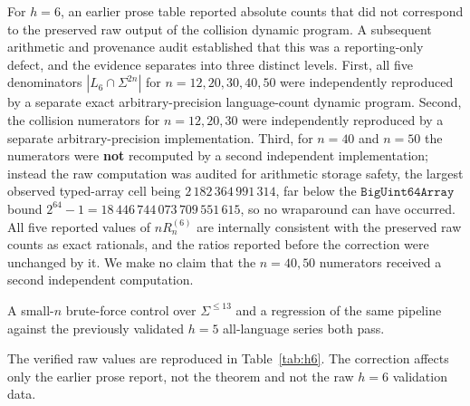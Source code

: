 For \(h=6\), an earlier prose table reported absolute counts that did not
correspond to the preserved raw output of the collision dynamic program. A
subsequent arithmetic and provenance audit established that this was a
reporting-only defect, and the evidence separates into three distinct levels.
First, all five denominators \(|L_6\cap\Sigma^{2n}|\) for
\(n=12,20,30,40,50\) were independently reproduced by a separate exact
arbitrary-precision language-count dynamic program. Second, the collision
numerators for \(n=12,20,30\) were independently reproduced by a separate
arbitrary-precision implementation. Third, for \(n=40\) and \(n=50\) the
numerators were \textbf{not} recomputed by a second independent
implementation; instead the raw computation was audited for arithmetic storage
safety, the largest observed typed-array cell being \(2\,182\,364\,991\,314\),
far below the \(\mathtt{BigUint64Array}\) bound
\(2^{64}-1=18\,446\,744\,073\,709\,551\,615\), so no wraparound can have
occurred. All five reported values of \(nR_n^{(6)}\) are internally consistent
with the preserved raw counts as exact rationals, and the ratios reported
before the correction were unchanged by it. We make no claim that the
\(n=40,50\) numerators received a second independent computation.

A small-\(n\) brute-force control over \(\Sigma^{\le 13}\) and a regression of
the same pipeline against the previously validated \(h=5\) all-language series
both pass.

The verified raw values are reproduced in Table~\ref{tab:h6}. The correction
affects only the earlier prose report, not the theorem and not the raw
\(h=6\) validation data.
